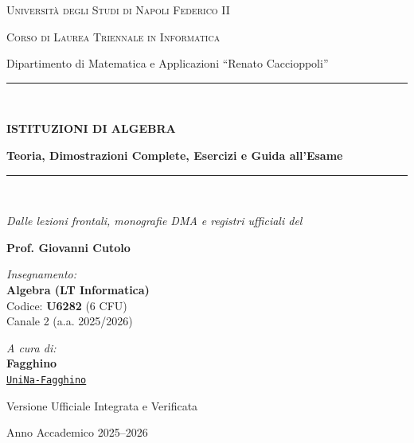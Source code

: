 \documentclass[11pt,a4paper,twoside,openright]{book}
\begin{document}
\begin{titlepage}
    \centering
    \vspace*{1.5cm}
    
    {\scshape\LARGE Università degli Studi di Napoli Federico II \par}
    \vspace{0.3cm}
    {\scshape\Large Corso di Laurea Triennale in Informatica \par}
    \vspace{0.2cm}
    {\large Dipartimento di Matematica e Applicazioni ``Renato Caccioppoli'' \par}
    
    \vspace{1.8cm}
    \rule{\linewidth}{1.2pt} \\[0.4cm]
    {\Huge \bfseries ISTITUZIONI DI ALGEBRA \par}
    \vspace{0.3cm}
    {\Large \bfseries Teoria, Dimostrazioni Complete, Esercizi e Guida all'Esame \par}
    \rule{\linewidth}{1.2pt} \\[0.5cm]
    
    {\large \itshape Dalle lezioni frontali, monografie DMA e registri ufficiali del \par}
    \vspace{0.2cm}
    {\Large \bfseries Prof. Giovanni Cutolo \par}
    
    \vfill
    
    \begin{minipage}{0.48\textwidth}
        \begin{flushleft} \large
            \emph{Insegnamento:}\\
            \textbf{Algebra (LT Informatica)}\\
            Codice: \textbf{U6282} (6 CFU)\\
            Canale 2 (a.a. 2025/2026)
        \end{flushleft}
    \end{minipage}
    \hfill
    \begin{minipage}{0.48\textwidth}
        \begin{flushright} \large
            \emph{A cura di:}\\
            \textbf{Fagghino}\\
            \href{https://github.com/UniNa-Fagghino/Algebra-Cutolo}{\texttt{UniNa-Fagghino}}
        \end{flushright}
    \end{minipage}
    
    \vspace{1.5cm}
    {\large Versione Ufficiale Integrata e Verificata \par}
    {\large Anno Accademico 2025--2026 \par}
\end{titlepage}
\end{document}
